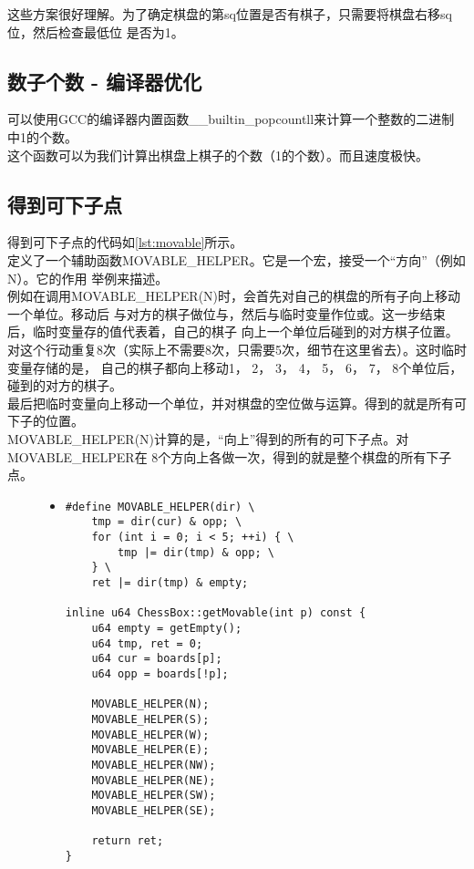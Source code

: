 \documentclass[a4paper]{article}
\begin{document}
这些方案很好理解。为了确定棋盘的第sq位置是否有棋子，只需要将棋盘右移sq位，然后检查最低位
是否为1。

\subsection{数子个数 - 编译器优化}
可以使用GCC的编译器内置函数\_\_builtin\_popcountll来计算一个整数的二进制中1的个数。\\

这个函数可以为我们计算出棋盘上棋子的个数（1的个数）。而且速度极快。

\subsection{得到可下子点}
得到可下子点的代码如\autoref{lst:movable}所示。\\

定义了一个辅助函数MOVABLE\_HELPER。它是一个宏，接受一个``方向''（例如N）。它的作用
举例来描述。\\

例如在调用MOVABLE\_HELPER(N)时，会首先对自己的棋盘的所有子向上移动一个单位。移动后
与对方的棋子做位与，然后与临时变量作位或。这一步结束后，临时变量存的值代表着，自己的棋子
向上一个单位后碰到的对方棋子位置。\\

对这个行动重复8次（实际上不需要8次，只需要5次，细节在这里省去）。这时临时变量存储的是，
自己的棋子都向上移动1， 2， 3， 4， 5， 6， 7， 8个单位后，碰到的对方的棋子。\\

最后把临时变量向上移动一个单位，并对棋盘的空位做与运算。得到的就是所有可下子的位置。\\

MOVABLE\_HELPER(N)计算的是，``向上''得到的所有的可下子点。对MOVABLE\_HELPER在
8个方向上各做一次，得到的就是整个棋盘的所有下子点。
\begin{figure}[!hbt]
\begin{itemize}
\item[] \begin{lstlisting}[style=mycpp, label=lst:movable, caption=得到可下子点的具体代码]
#define MOVABLE_HELPER(dir) \
    tmp = dir(cur) & opp; \
    for (int i = 0; i < 5; ++i) { \
        tmp |= dir(tmp) & opp; \
    } \
    ret |= dir(tmp) & empty;

inline u64 ChessBox::getMovable(int p) const {
    u64 empty = getEmpty();
    u64 tmp, ret = 0;
    u64 cur = boards[p];
    u64 opp = boards[!p];

    MOVABLE_HELPER(N);
    MOVABLE_HELPER(S);
    MOVABLE_HELPER(W);
    MOVABLE_HELPER(E);
    MOVABLE_HELPER(NW);
    MOVABLE_HELPER(NE);
    MOVABLE_HELPER(SW);
    MOVABLE_HELPER(SE);

    return ret;
}
\end{lstlisting}
\end{itemize}
\end{figure}
\end{document}
